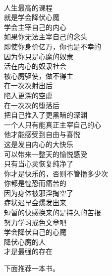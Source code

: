 \begin{poem}[大主宰]
    \begin{multicols}{2}
        \begin{center}~\\
            人生最高的课程 \\ 就是学会降伏心魔 \\ 学会主宰自己的内心 \\ 如果你无法主宰自己的念头 \\ 即使你身价亿万，你也是不幸的 \\ 因为你只是心魔的奴隶 \\ 活在内心的奴隶社会 \\ 被心魔驱使，做不得主 \\ 在一次次射出后 \\ 陷入更深的空虚 \\ 在一次次的堕落后 \\ 把自己推入了更黑暗的深渊 \\ 一个人只有能真正主宰自己的心 \\ 他才能感受到自由与喜悦 \\ 这是发自内心的大快乐 \\ 可以带来一整天的愉悦感受 \\ 只有当心灵恢复纯净了 \\ 你才是快乐的，否则不管撸多少次 \\ 你都是惶恐而痛苦的 \\ 因为身体被邪淫掏空了 \\ 症状迟早会爆发出来 \\ 短暂的快感换来的是持久的苦报 \\ 努力学习戒色文章吧 \\ 学会降伏自己的心魔 \\ 降伏心魔的人 \\ 才是最强的存在
        \end{center}
    \end{multicols}
\end{poem}

下面推荐一本书。


